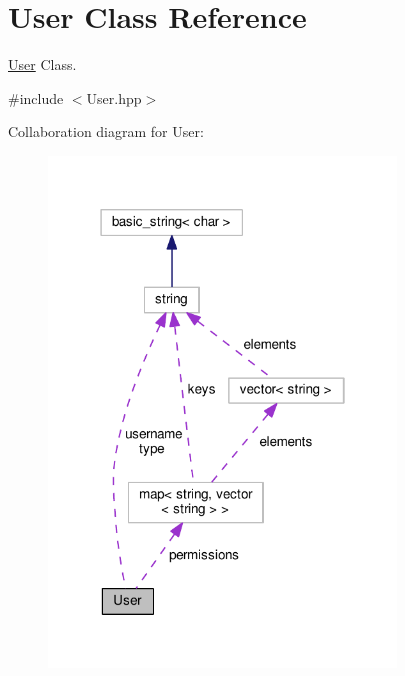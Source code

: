 \hypertarget{class_user}{\section{User Class Reference}
\label{class_user}
}


\hyperlink{class_user}{User} Class.  




{\ttfamily \#include $<$User.\-hpp$>$}



Collaboration diagram for User\-:\nopagebreak
\begin{figure}[H]
\begin{center}
\leavevmode
\includegraphics[width=262pt]{class_user__coll__graph}
\end{center}
\end{figure}
